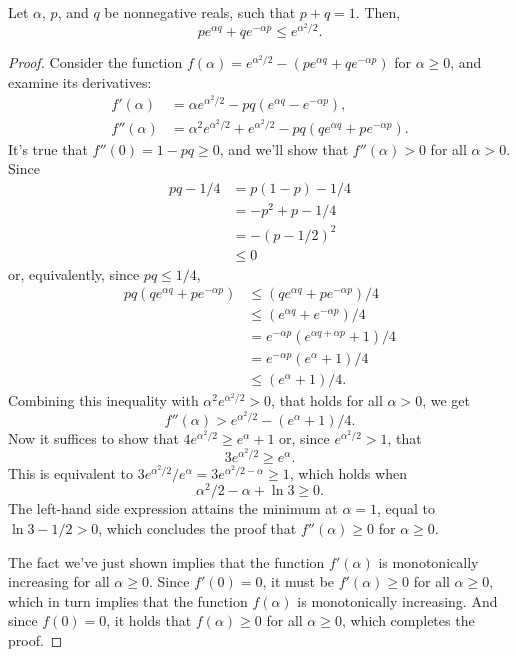 \starred
\begin{minipage}[t]{\textwidth}
\begin{numberedlemma}
    Let $\alpha$, $p$, and $q$ be nonnegative reals, such that $p+q=1$. \label{thm:exp-combination-upper-bound}
    Then,
    \[
        pe^{\alpha q}+qe^{-\alpha p} \le e^{\alpha^2\!/2}.
    \]
\end{numberedlemma}
\end{minipage}

\begin{proof}
    Consider the function $f(\alpha)=e^{\alpha^2\!/2}-(pe^{\alpha q}+qe^{-\alpha p})$ for $\alpha\ge0$, and examine its derivatives:
    \begin{align*}
        f'(\alpha) &= \alpha e^{\alpha^2\!/2}-pq(e^{\alpha q}-e^{-\alpha p}), \\
        f''(\alpha) &= \alpha^2e^{\alpha^2\!/2}+e^{\alpha^2\!/2}-pq(qe^{\alpha q}+pe^{-\alpha p}).
    \end{align*}
    It's true that $f''(0)=1-pq\ge0$, and we'll show that $f''(\alpha)>0$ for all $\alpha>0$.
    Since
    \begin{align*}
        pq-1/4 &= p(1-p)-1/4 \\
        &= -p^2+p-1/4 \\
        &= -(p-1/2)^2 \\
        &\le 0
    \end{align*}
    or, equivalently, since $pq\le1/4$,
    \begin{align*}
        pq(qe^{\alpha q}+pe^{-\alpha p}) &\le (qe^{\alpha q}+pe^{-\alpha p})/4 \\
        &\le (e^{\alpha q}+e^{-\alpha p})/4 \\
        &= e^{-\alpha p}(e^{\alpha q+\alpha p}+1)/4 \\
        &= e^{-\alpha p}(e^\alpha+1)/4 \\
        &\le (e^\alpha+1)/4.
    \end{align*}
    Combining this inequality with $\alpha^2e^{\alpha^2\!/2}>0$, that holds for all $\alpha>0$, we get
    \[
        f''(\alpha) > e^{\alpha^2\!/2}-(e^\alpha+1)/4.
    \]
    Now it suffices to show that $4e^{\alpha^2\!/2}\ge e^\alpha+1$ or, since $e^{\alpha^2\!/2}>1$, that
    \[
        3e^{\alpha^2\!/2} \ge e^\alpha.
    \]
    This is equivalent to $3e^{\alpha^2\!/2}\!/e^\alpha=3e^{\alpha^2\!/2-\alpha}\ge1$, which holds when
    \[
        \alpha^2\!/2-\alpha+\ln3 \ge 0.
    \]
    The left-hand side expression attains the minimum at $\alpha=1$, equal to $\ln3-1/2>0$, which concludes the proof that $f''(\alpha)\ge0$ for $\alpha\ge0$.

    The fact we've just shown implies that the function $f'(\alpha)$ is monotonically increasing for all $\alpha\ge0$.
    Since $f'(0)=0$, it must be $f'(\alpha)\ge0$ for all $\alpha\ge0$, which in turn implies that the function $f(\alpha)$ is monotonically increasing.
    And since $f(0)=0$, it holds that $f(\alpha)\ge0$ for all $\alpha\ge0$, which completes the proof.
\end{proof}

